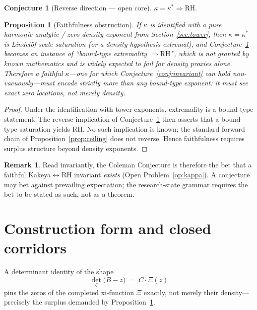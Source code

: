 \documentclass[11pt]{amsart}
\theoremstyle{plain}
\newtheorem{proposition}[theorem]{Proposition}
\theoremstyle{definition}
\newtheorem{remark}[theorem]{Remark}
\newtheorem{conjecture}[theorem]{Conjecture}
\newcommand{\RH}{\mathrm{RH}}
\begin{document}
\begin{conjecture}[Reverse direction --- open core]
\label{conj:reverse}
\statusbox{\PeAIceOpen\ (at least as hard as $\RH$).}
$\kappa=\kappa^*\Rightarrow\RH$.
\end{conjecture}

\begin{proposition}[Faithfulness obstruction]
\label{prop:faithful}
If $\kappa$ is identified with a pure harmonic-analytic / zero-density exponent
from Section~\ref{sec:tower}, then $\kappa=\kappa^*$ is Lindel\"of-scale
saturation (or a density-hypothesis extremal), and Conjecture~\ref{conj:reverse}
becomes an instance of ``bound-type extremality $\Rightarrow\RH$'', which is not
granted by known mathematics and is widely expected to fail for density proxies
alone.
Therefore a \emph{faithful} $\kappa$---one for which Conjecture~\ref{conj:invariant}
can hold non-vacuously---must encode strictly more than any bound-type
exponent: it must see exact zero \emph{locations}, not merely density.
\end{proposition}

\begin{proof}
Under the identification with tower exponents, extremality is a bound-type
statement.
The reverse implication of Conjecture~\ref{conj:reverse} then asserts that a
bound-type saturation yields $\RH$.
No such implication is known; the standard forward chain of
Proposition~\ref{prop:ceiling} does not reverse.
Hence faithfulness requires surplus structure beyond density exponents.
\end{proof}

\begin{remark}
Read invariantly, the Coleman Conjecture is therefore the bet that a faithful
Kakeya$\leftrightarrow\RH$ invariant \emph{exists}
(Open Problem~\ref{op:kappa}).
A conjecture may bet against prevailing expectation; the research-state grammar
requires the bet to be stated as such, not as a theorem.
\end{remark}

\section{Construction form and closed corridors}
\label{sec:construction}

A determinant identity of the shape
\begin{equation}
  \label{eq:det}
  \det_\zeta\bigl(B-z\bigr) \;=\; C\cdot \Xi(z)
\end{equation}
pins the zeros of the completed xi-function $\Xi$ exactly, not merely their
density---precisely the surplus demanded by Proposition~\ref{prop:faithful}.
\end{document}
